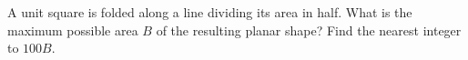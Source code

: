 A unit square is folded along a line dividing its area in half. What is the maximum possible area $B$ of the resulting planar shape? Find the nearest integer to $100B$.
